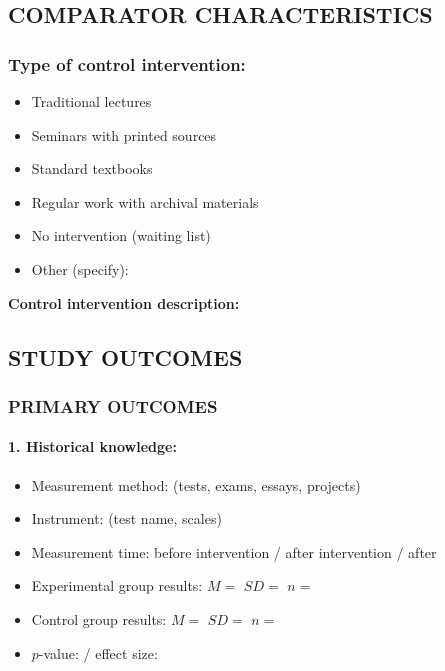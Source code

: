 \documentclass[
hf,
]{ceurart}
\begin{document}
\subsection*{COMPARATOR CHARACTERISTICS}

\subsubsection*{Type of control intervention:}
\begin{itemize}[label=$\square$]
    \item Traditional lectures
    \item Seminars with printed sources
    \item Standard textbooks
    \item Regular work with archival materials
    \item No intervention (waiting list)
    \item Other (specify): \underline{\hspace{4cm}}
\end{itemize}

\noindent\textbf{Control intervention description:} \underline{\hspace{6cm}}

\subsection*{STUDY OUTCOMES}

\subsubsection*{PRIMARY OUTCOMES}

\paragraph{1. Historical knowledge:}
\begin{itemize}
    \item Measurement method: \underline{\hspace{4cm}} (tests, exams, essays, projects)
    \item Instrument: \underline{\hspace{4cm}} (test name, scales)
    \item Measurement time: before intervention / after intervention / after \underline{\hspace{2cm}}
    \item Experimental group results: $M =$ \underline{\hspace{1cm}} $SD =$ \underline{\hspace{1cm}} $n =$ \underline{\hspace{1cm}}
    \item Control group results: $M =$ \underline{\hspace{1cm}} $SD =$ \underline{\hspace{1cm}} $n =$ \underline{\hspace{1cm}}
    \item $p$-value: \underline{\hspace{2cm}} / effect size: \underline{\hspace{2cm}}
\end{itemize}
\end{document}
